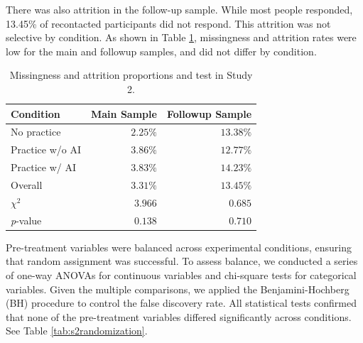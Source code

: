\documentclass[11pt]{report}
\begin{document}
\begin{append}
There was also attrition in the follow-up sample. While most people responded, 13.45\% of recontacted participants did not respond. This attrition was not selective by condition. As shown in Table \ref{tab:s2missingness}, missingness and attrition rates were low for the main and followup samples, and did not differ by condition.

\begin{table}[ht]
    \centering
    \caption{Missingness and attrition proportions and test in Study 2.}

\begin{tabular}{lrr}
\toprule
Condition & Main Sample & Followup Sample \\ 
\midrule\addlinespace[2.5pt]
No practice & $2.25\%$ & $13.38\%$ \\ 
Practice w/o AI & $3.86\%$ & $12.77\%$ \\ 
Practice w/ AI & $3.83\%$ & $14.23\%$ \\ 
\midrule
Overall & $3.31\%$ & $13.45\%$ \\ 
\midrule\addlinespace[2.5pt]
$\chi^2$ & $3.966$ & $0.685$ \\ 
\textit{p}-value & $0.138$ & $0.710$ \\ 
\bottomrule
\end{tabular}

    \label{tab:s2missingness}
\end{table}

Pre-treatment variables were balanced across experimental conditions, ensuring that random assignment was successful. To assess balance, we conducted a series of one-way ANOVAs for continuous variables and chi-square tests for categorical variables. Given the multiple comparisons, we applied the Benjamini-Hochberg (BH) procedure to control the false discovery rate. All statistical tests confirmed that none of the pre-treatment variables differed significantly across conditions. See Table \ref{tab:s2randomization}.


\end{append}
\end{document}
